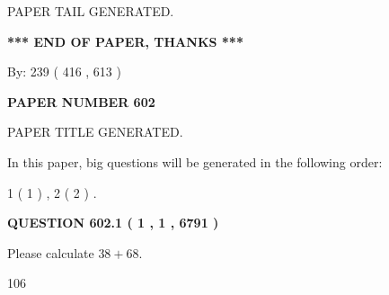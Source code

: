 \documentclass[12pt]{article}
\begin{document}
   
   
\vspace{2.0in} PAPER TAIL GENERATED.
   
   
   
   
\vspace{1.0in} 
{\textbf{\large{ *** END OF PAPER, THANKS *** }}} 
   
   
\hspace{1.0in} By: 
 239 ( 416 ,  613 )
   
   
   
   
\newpage 
\setcounter{page}{ 
   602001 } 
   
   
   
   
 {\textbf{ \Large{ PAPER NUMBER  602  }}}
   
   
\vspace{0.2in}
   
   
   
   
   
   
   
   
 \vspace{0.2in}
 
 
 
 
   
   
 PAPER TITLE GENERATED.
   
   
   
\vspace{0.2in}
   
In this paper, big questions will be generated in the following order: 
   
   
   1 ( 1 )
 ,
   2 ( 2 )
 .
  
\vspace{0.2in}
  
{\textbf{\Large{QUESTION
602.1 
 ( 1 , 1 , 6791 )
}}}
  
  
 
Please calculate $ %
38 +  %
68 $.
 
 
 
\noindent{}
 
 

106
 
 
\noindent{}
 
 

 
 
 
\noindent{}
 
\end{document}
